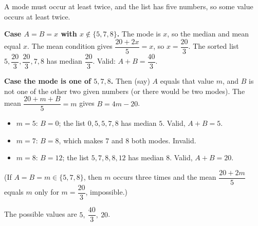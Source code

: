 A mode must occur at least twice, and the list has five numbers, so some value occurs at least twice.

\textbf{Case $A=B=x$ with $x\notin\{5,7,8\}$.} The mode is $x$, so the median and mean equal $x$. The mean condition gives $\dfrac{20+2x}{5}=x$, so $x=\dfrac{20}{3}$. The sorted list $5,\dfrac{20}{3},\dfrac{20}{3},7,8$ has median $\dfrac{20}{3}$. Valid: $A+B=\dfrac{40}{3}$.

\textbf{Case the mode is one of $5,7,8$.} Then (say) $A$ equals that value $m$, and $B$ is not one of the other two given numbers (or there would be two modes). The mean $\dfrac{20+m+B}{5}=m$ gives $B=4m-20$.
\begin{itemize}
\item $m=5$: $B=0$; the list $0,5,5,7,8$ has median $5$. Valid, $A+B=5$.
\item $m=7$: $B=8$, which makes $7$ and $8$ both modes. Invalid.
\item $m=8$: $B=12$; the list $5,7,8,8,12$ has median $8$. Valid, $A+B=20$.
\end{itemize}
(If $A=B=m\in\{5,7,8\}$, then $m$ occurs three times and the mean $\dfrac{20+2m}{5}$ equals $m$ only for $m=\dfrac{20}{3}$, impossible.)

The possible values are $\boxed{5,\ \dfrac{40}{3},\ 20}$.
